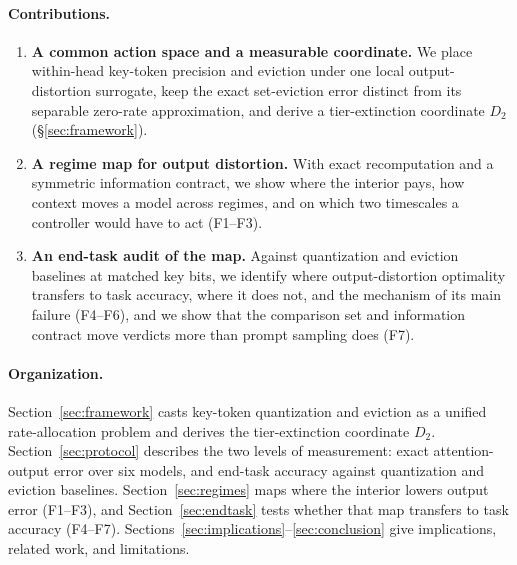 \documentclass{article}
\theoremstyle{definition}
\begin{document}
\paragraph{Contributions.}
\begin{enumerate}[leftmargin=*,itemsep=1pt,topsep=2pt]
  \item \textbf{A common action space and a measurable coordinate.} We place within-head key-token precision and eviction under one local output-distortion surrogate, keep the exact set-eviction error distinct from its separable zero-rate approximation, and derive a tier-extinction coordinate $D_2$ (\S\ref{sec:framework}).
  \item \textbf{A regime map for output distortion.} With exact recomputation and a symmetric information contract, we show where the interior pays, how context moves a model across regimes, and on which two timescales a controller would have to act (F1--F3).
  \item \textbf{An end-task audit of the map.} Against quantization and eviction baselines at matched key bits, we identify where output-distortion optimality transfers to task accuracy, where it does not, and the mechanism of its main failure (F4--F6), and we show that the comparison set and information contract move verdicts more than prompt sampling does (F7).
\end{enumerate}


\paragraph{Organization.}  Section~\ref{sec:framework} casts key-token quantization and eviction as a unified rate-allocation problem and derives the tier-extinction coordinate $D_2$.  
Section~\ref{sec:protocol} describes the two levels of measurement: exact attention-output error over six models, and end-task accuracy against quantization and eviction baselines.  
Section~\ref{sec:regimes} maps where the interior lowers output error (F1--F3), and Section~\ref{sec:endtask} tests whether that map transfers to task accuracy (F4--F7).  
Sections~\ref{sec:implications}--\ref{sec:conclusion} give implications, related work, and limitations.

\end{document}
